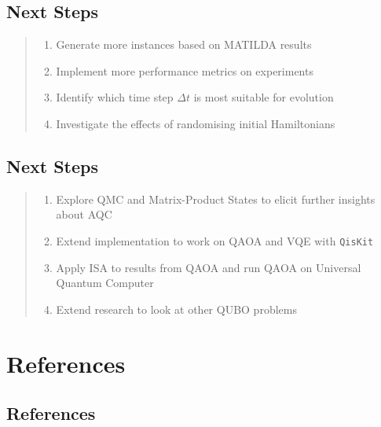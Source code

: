 \documentclass[
]{article}
\providecommand{\tightlist}{%
  \setlength{\itemsep}{0pt}\setlength{\parskip}{0pt}}
\begin{document}
\hypertarget{next-steps-1}{%
\subsection{Next Steps}\label{next-steps-1}}

\begin{quote}
\begin{enumerate}
\def\labelenumi{\arabic{enumi}.}
\tightlist
\item
  Generate more instances based on MATILDA results
\item
  Implement more performance metrics on experiments
\item
  Identify which time step \(\Delta t\) is most suitable for evolution
\item
  Investigate the effects of randomising initial Hamiltonians
\end{enumerate}
\end{quote}

\hypertarget{next-steps-2}{%
\subsection{Next Steps}\label{next-steps-2}}

\begin{quote}
\begin{enumerate}
\def\labelenumi{\arabic{enumi}.}
\setcounter{enumi}{4}
\tightlist
\item
  Explore QMC and Matrix-Product States to elicit further insights about
  AQC
\item
  Extend implementation to work on QAOA and VQE with \texttt{QisKit}
\item
  Apply ISA to results from QAOA and run QAOA on Universal Quantum
  Computer
\item
  Extend research to look at other QUBO problems
\end{enumerate}
\end{quote}

\hypertarget{references}{%
\section{References}\label{references}}

\hypertarget{references-1}{%
\subsection{References}\label{references-1}}
\end{document}
